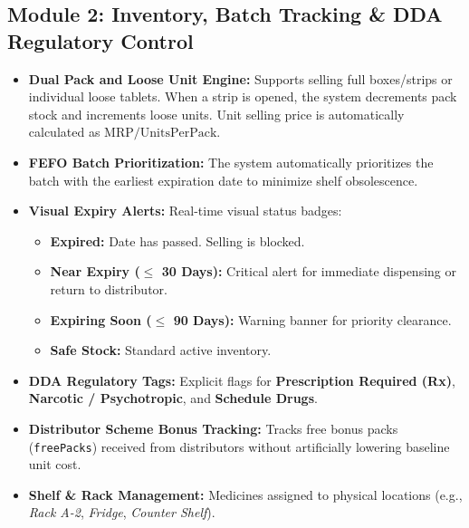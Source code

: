 \documentclass[10pt,a4paper]{article}
\begin{document}
\subsection{Module 2: Inventory, Batch Tracking \& DDA Regulatory Control}
\begin{itemize}
    \item \textbf{Dual Pack and Loose Unit Engine:} Supports selling full boxes/strips or individual loose tablets. When a strip is opened, the system decrements pack stock and increments loose units. Unit selling price is automatically calculated as $\text{MRP} / \text{UnitsPerPack}$.
    \item \textbf{FEFO Batch Prioritization:} The system automatically prioritizes the batch with the earliest expiration date to minimize shelf obsolescence.
    \item \textbf{Visual Expiry Alerts:} Real-time visual status badges:
    \begin{itemize}
        \item \colorbox{RoseLight}{\textbf{\color{RoseDanger}Expired:}} Date has passed. Selling is blocked.
        \item \colorbox{AmberLight}{\textbf{\color{AmberWarning}Near Expiry ($\le$ 30 Days):}} Critical alert for immediate dispensing or return to distributor.
        \item \colorbox{AmberLight}{\textbf{\color{AmberWarning}Expiring Soon ($\le$ 90 Days):}} Warning banner for priority clearance.
        \item \colorbox{EmeraldLight}{\textbf{\color{EmeraldSuccess}Safe Stock:}} Standard active inventory.
    \end{itemize}
    \item \textbf{DDA Regulatory Tags:} Explicit flags for \textbf{Prescription Required (Rx)}, \textbf{Narcotic / Psychotropic}, and \textbf{Schedule Drugs}.
    \item \textbf{Distributor Scheme Bonus Tracking:} Tracks free bonus packs (\texttt{freePacks}) received from distributors without artificially lowering baseline unit cost.
    \item \textbf{Shelf \& Rack Management:} Medicines assigned to physical locations (e.g., \textit{Rack A-2}, \textit{Fridge}, \textit{Counter Shelf}).
\end{itemize}
\end{document}
